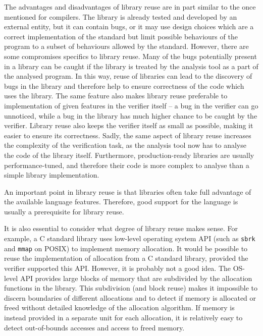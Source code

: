 The advantages and disadvantages of library reuse are in part similar to the
once mentioned for compilers.
The library is already tested and developed by
an external entity, but it can contain bugs, or it may use design choices which
are a correct implementation of the standard but limit possible behaviours of
the program to a subset of behaviours allowed by the standard.
However, there are some compromises specifics to library reuse.
Many of the bugs potentially present in a library can be caught if the
library is treated by the analysis tool as a part of the analysed program.
In this way, reuse of libraries can lead to the discovery of bugs in the
library and therefore help to ensure correctness of the code which uses the
library.
The same feature also makes library reuse preferable to implementation of given features in the verifier itself -- a bug in the verifier can go unnoticed, while a bug in the library has much higher chance to be caught by the verifier.
Library reuse also keeps the verifier itself as small as possible, making it easier to ensure its correctness.
Sadly, the same aspect of library reuse increases the complexity of the verification task, as the analysis tool now has to analyse the code of the library itself.
Furthermore, production-ready libraries are usually performance-tuned, and therefore their code is more complex to analyse than a simple library implementation.

An important point in library reuse is that libraries often take full advantage of the available language features.
Therefore, good support for the language is usually a prerequisite for library reuse.

It is also essential to consider what degree of library reuse makes sense.
For example, a C standard library uses low-level operating system API (such as
\texttt{sbrk} and \texttt{mmap} on POSIX) to implement memory allocation.
It would be possible to reuse the implementation of allocation from a C
standard library, provided the verifier supported this API.
However, it is probably not a good idea.
The OS-level API provides large blocks of memory that are subdivided by the allocation functions in the library.
This subdivision (and block reuse) makes it impossible to discern boundaries of different allocations and to detect if memory is allocated or freed without detailed knowledge of the allocation algorithm.
If memory is instead provided in a separate unit for each allocation, it is relatively easy to detect out-of-bounds accesses and access to freed memory.

